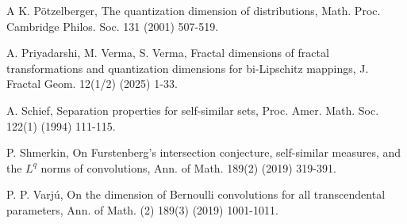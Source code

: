 \documentclass{amsproc}
\theoremstyle{definition}
\theoremstyle{remark}
\numberwithin{equation}{section}
\begin{document}
\begin{thebibliography}{A}
       K. P\"otzelberger, The quantization dimension of distributions, Math. Proc. Cambridge Philos. Soc. 131 (2001) 507-519.
      







 A. Priyadarshi, M. Verma, S. Verma, Fractal dimensions of fractal transformations and quantization dimensions for bi-Lipschitz mappings, J. Fractal Geom. 12(1/2) (2025) 1-33.



 A. Schief, Separation properties for self-similar sets, Proc. Amer. Math. Soc. 122(1) (1994) 111-115.

 P. Shmerkin, On Furstenberg's intersection conjecture, self-similar measures, and the $L^q$ norms of convolutions, Ann. of Math. 189(2) (2019) 319-391.






 P. P. Varj\'u, On the dimension of Bernoulli convolutions for all transcendental parameters, Ann. of Math. (2) 189(3) (2019) 1001-1011.




\end{thebibliography}
\end{document}
